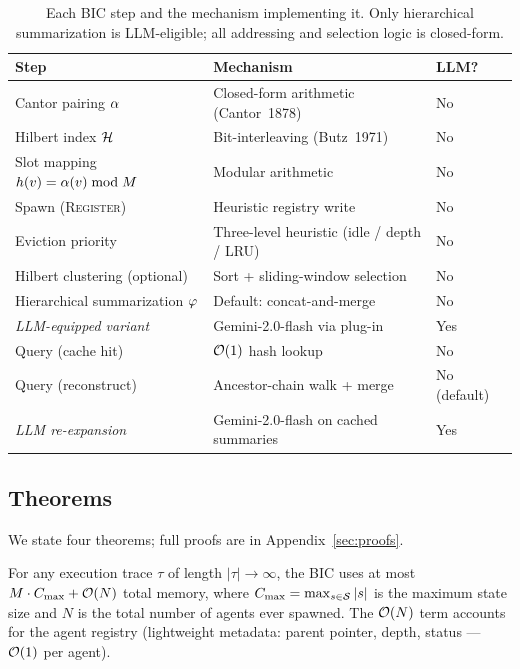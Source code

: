 \begin{table}[t]
\centering
\small
\caption{Each BIC step and the mechanism implementing it.  Only
  hierarchical summarization is LLM-eligible; all addressing and
  selection logic is closed-form.}
\label{tab:mechanisms}
\vspace{0.3em}
\begin{tabular}{lll}
\toprule
\textbf{Step} & \textbf{Mechanism} & \textbf{LLM?} \\
\midrule
Cantor pairing $\alpha$ & Closed-form arithmetic (Cantor~1878) & No \\
Hilbert index $\mathcal{H}$ & Bit-interleaving (Butz~1971) & No \\
Slot mapping $h(v) = \alpha(v) \bmod M$ & Modular arithmetic & No \\
Spawn (\textsc{Register}) & Heuristic registry write & No \\
Eviction priority & Three-level heuristic (idle / depth / LRU) & No \\
Hilbert clustering (optional) & Sort + sliding-window selection & No \\
Hierarchical summarization $\varphi$ & Default: concat-and-merge & No \\
\quad\emph{LLM-equipped variant} & Gemini-2.0-flash via plug-in & Yes \\
Query (cache hit) & $\mathcal{O}(1)$ hash lookup & No \\
Query (reconstruct) & Ancestor-chain walk + merge & No (default) \\
\quad\emph{LLM re-expansion} & Gemini-2.0-flash on cached summaries & Yes \\
\bottomrule
\end{tabular}
\end{table}


\subsection{Theorems}
\label{sec:theorems}

We state four theorems; full proofs are in Appendix~\ref{sec:proofs}.

\begin{theorem}
\label{thm:bounded}
For any execution trace $\tau$ of length $|\tau| \to \infty$, the BIC
uses at most $M \cdot C_{\max} + \mathcal{O}(N)$ total memory, where
$C_{\max} = \max_{s \in \mathcal{S}} |s|$ is the maximum state size and
$N$ is the total number of agents ever spawned.  The $\mathcal{O}(N)$ term
accounts for the agent registry (lightweight metadata: parent pointer,
depth, status --- $\mathcal{O}(1)$ per agent).
\end{theorem}


